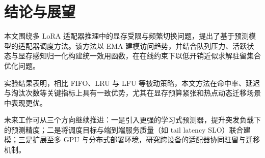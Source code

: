 \section{结论与展望}
本文围绕多 LoRA 适配器推理中的显存受限与频繁切换问题，提出了基于预测模型的适配器调度方法。该方法以 EMA 建模访问趋势，并结合队列压力、活跃状态与显存感知归一化构建统一效用函数，在在线约束下以低开销近似求解驻留集合优化问题。

实验结果表明，相比 FIFO、LRU 与 LFU 等被动策略，本文方法在命中率、延迟与淘汰次数等关键指标上具有一致优势，尤其在显存预算紧张和热点动态迁移场景中表现更优。

未来工作可从三个方向继续推进：一是引入更强的学习式预测器，提升突发负载下的预测精度；二是将调度目标与端到端服务质量（如 tail latency SLO）联合建模；三是扩展至多 GPU 与分布式部署环境，研究跨设备的适配器协同驻留与迁移机制。
